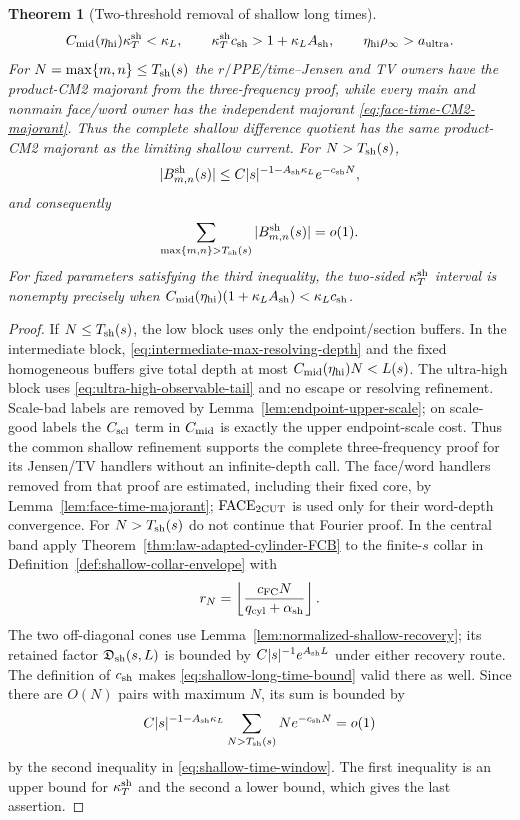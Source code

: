 \documentclass[11pt]{article}
\newtheorem{theorem}{Theorem}[section]
\begin{document}
\begin{theorem}[Two-threshold removal of shallow long times]
\begin{equation}
\label{eq:shallow-time-window}
 C_{\rm mid}(\eta_{\rm hi})\kappa_T^{\rm sh}<\kappa_L,
 \qquad
 \kappa_T^{\rm sh}c_{\rm sh}>1+\kappa_LA_{\rm sh},
 \qquad \eta_{\rm hi}\rho_\infty>a_{\rm ultra}.
\end{equation}
For $N=\max\{m,n\}\le T_{\rm sh}(s)$ the $r/$PPE/time--Jensen and TV
owners have the product-CM2 majorant from the three-frequency proof, while
every main and nonmain face/word owner has the independent majorant
\eqref{eq:face-time-CM2-majorant}.  Thus the complete shallow difference
quotient has the same product-CM2 majorant as the limiting shallow current.
For
$N>T_{\rm sh}(s)$,
\begin{equation}
\label{eq:shallow-long-time-bound}
 |B^{\rm sh}_{m,n}(s)|
 \le C|s|^{-1-A_{\rm sh}\kappa_L}e^{-c_{\rm sh}N},
\end{equation}
and consequently
\begin{equation}
\label{eq:shallow-long-time-sum}
 \sum_{\max\{m,n\}>T_{\rm sh}(s)}
 |B^{\rm sh}_{m,n}(s)|=o(1).
\end{equation}
For fixed parameters satisfying the third inequality, the two-sided
$\kappa_T^{\rm sh}$ interval is nonempty precisely when
$C_{\rm mid}(\eta_{\rm hi})(1+\kappa_LA_{\rm sh})
 <\kappa_Lc_{\rm sh}$.
\end{theorem}

\begin{proof}
If $N\le T_{\rm sh}(s)$, the low block uses only the endpoint/section
buffers.  In the intermediate block, \eqref{eq:intermediate-max-resolving-depth}
and the fixed homogeneous buffers give total depth at most
$C_{\rm mid}(\eta_{\rm hi})N<L(s)$.  The ultra-high block uses
\eqref{eq:ultra-high-observable-tail} and no escape or resolving refinement.
Scale-bad labels are removed by Lemma~\ref{lem:endpoint-upper-scale}; on
scale-good labels the $C_{\rm scl}$ term in $C_{\rm mid}$ is exactly the
upper endpoint-scale cost.  Thus the common shallow refinement supports the
complete three-frequency proof for its Jensen/TV handlers without an
infinite-depth call.  The face/word handlers removed from that proof are
estimated, including their fixed core, by
Lemma~\ref{lem:face-time-majorant}; $\mathrm{FACE}_{\rm 2CUT}$ is used only
for their word-depth convergence.  For $N>T_{\rm sh}(s)$ do not continue
that Fourier proof.  In the central band apply
Theorem~\ref{thm:law-adapted-cylinder-FCB} to the finite-$s$ collar in
Definition~\ref{def:shallow-collar-envelope} with
\[
 r_N=\left\lfloor\frac{c_{\rm FC}N}
 {q_{\rm cyl}+\alpha_{\rm sh}}\right\rfloor .
\]
The two off-diagonal cones use
Lemma~\ref{lem:normalized-shallow-recovery}; its retained factor
$\mathfrak D_{\rm sh}(s,L)$ is bounded by
$C|s|^{-1}e^{A_{\rm sh}L}$ under either recovery route.  The definition of $c_{\rm sh}$ makes
\eqref{eq:shallow-long-time-bound} valid there as well.  Since there are $O(N)$ pairs
with maximum $N$, its sum is bounded by
\[
 C|s|^{-1-A_{\rm sh}\kappa_L}
 \sum_{N>T_{\rm sh}(s)}Ne^{-c_{\rm sh}N}=o(1)
\]
by the second inequality in \eqref{eq:shallow-time-window}.  The first
inequality is an upper bound for $\kappa_T^{\rm sh}$ and the second a lower
bound, which gives the last assertion.
\end{proof}
\end{document}
